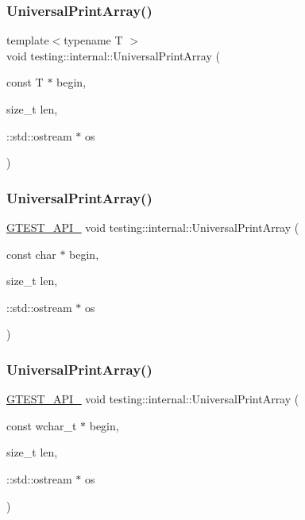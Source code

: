 \subsubsection{\texorpdfstring{UniversalPrintArray()}{UniversalPrintArray()}\hspace{0.1cm}{\footnotesize\ttfamily [3/5]}}
{\footnotesize\ttfamily template$<$typename T $>$ \\
void testing\+::internal\+::\+Universal\+Print\+Array (\begin{DoxyParamCaption}\item[{const T $\ast$}]{begin,  }\item[{size\+\_\+t}]{len,  }\item[{\+::std\+::ostream $\ast$}]{os }\end{DoxyParamCaption})}

\mbox{\label{namespacetesting_1_1internal_a72c997dbd2c562110b2cb56c359decfa}} 
\subsubsection{\texorpdfstring{UniversalPrintArray()}{UniversalPrintArray()}\hspace{0.1cm}{\footnotesize\ttfamily [4/5]}}
{\footnotesize\ttfamily \mbox{\hyperlink{gtest-port_8h_aa73be6f0ba4a7456180a94904ce17790}{G\+T\+E\+S\+T\+\_\+\+A\+P\+I\+\_\+}} void testing\+::internal\+::\+Universal\+Print\+Array (\begin{DoxyParamCaption}\item[{const char $\ast$}]{begin,  }\item[{size\+\_\+t}]{len,  }\item[{\+::std\+::ostream $\ast$}]{os }\end{DoxyParamCaption})}

\mbox{\label{namespacetesting_1_1internal_ae31e146c35fd75afc6a9cc73ae2692d1}} 
\subsubsection{\texorpdfstring{UniversalPrintArray()}{UniversalPrintArray()}\hspace{0.1cm}{\footnotesize\ttfamily [5/5]}}
{\footnotesize\ttfamily \mbox{\hyperlink{gtest-port_8h_aa73be6f0ba4a7456180a94904ce17790}{G\+T\+E\+S\+T\+\_\+\+A\+P\+I\+\_\+}} void testing\+::internal\+::\+Universal\+Print\+Array (\begin{DoxyParamCaption}\item[{const wchar\+\_\+t $\ast$}]{begin,  }\item[{size\+\_\+t}]{len,  }\item[{\+::std\+::ostream $\ast$}]{os }\end{DoxyParamCaption})}

